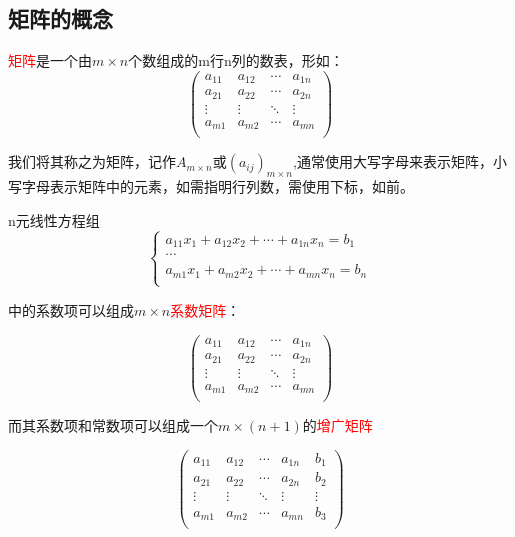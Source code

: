 \subsection{矩阵的概念}

\begin{definition}
	\textcolor{red}{矩阵}是一个由$m\times n$个数组成的m行n列的数表，形如：
	$$
	\begin{pmatrix}
	a_{11} &a_{12}&\cdots&a_{1n}\\
	a_{21}&a_{22}&\cdots&a_{2n}\\
	\vdots&\vdots&\ddots&\vdots\\
	a_{m1}&a_{m2}&\cdots&a_{mn}\\
	\end{pmatrix}
	$$

	我们将其称之为矩阵，记作$A_{m\times n}$或$(a_{ij})_{m\times n}$,通常使用大写字母来表示矩阵，小写字母表示矩阵中的元素，如需指明行列数，需使用下标，如前。
\end{definition}

n元线性方程组
$$
\begin{cases}
	a_{11}x_1+a_{12}{x_2}+\cdots+a_{1n}x_n=b_1\\
	\cdots\\
	a_{m1}x_1+a_{m2}x_2+\cdots+a_{mn}x_n=b_n\\
\end{cases}
$$

中的系数项可以组成$m\times n$\textcolor{red}{系数矩阵}：

	$$
\begin{pmatrix}
	a_{11} &a_{12}&\cdots&a_{1n}\\
	a_{21}&a_{22}&\cdots&a_{2n}\\
	\vdots&\vdots&\ddots&\vdots\\
	a_{m1}&a_{m2}&\cdots&a_{mn}\\
\end{pmatrix}
$$

而其系数项和常数项可以组成一个$m\times (n+1)$的\textcolor{red}{增广矩阵}

	$$
\begin{pmatrix}
	a_{11} &a_{12}&\cdots&a_{1n}&b_1\\
	a_{21}&a_{22}&\cdots&a_{2n}&b_2\\
	\vdots&\vdots&\ddots&\vdots&\vdots\\
	a_{m1}&a_{m2}&\cdots&a_{mn}&b_3\\
\end{pmatrix}
$$

